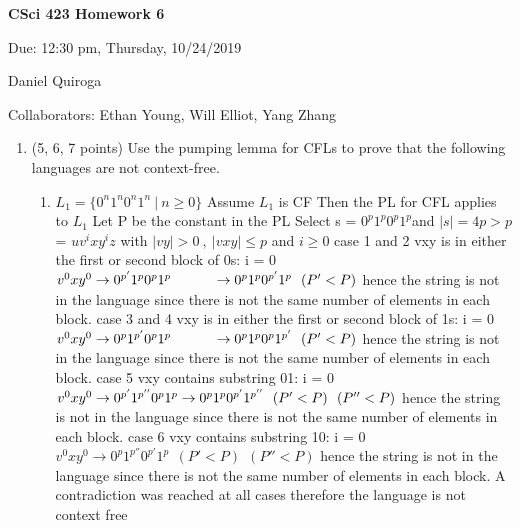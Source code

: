 \documentclass[11pt]{article}
\begin{document}
\begin{LARGE}
\centerline {\bf CSci 423 Homework 6}
\end{LARGE}
\vskip 0.25cm

\centerline{Due: 12:30 pm, Thursday, 10/24/2019}
\centerline{Daniel Quiroga}
Collaborators: Ethan Young, Will Elliot, Yang Zhang
\begin{enumerate}

\item (5, 6, 7 points) Use the pumping lemma for CFLs to prove that the following languages are not context-free.

\begin{enumerate}

\item $L_1=\{0^n1^n0^n1^n\ |\ n\ge0\}$
\newline Assume $L_1$ is CF \newline 
Then the PL for CFL applies to $L_1$ \newline 
Let P be the constant in the PL \newline 
Select s = $0^p1^p0^p1^p$and $|s| = 4p > p$\newline 
= $uv^ixy^iz$ with $|vy| > 0 \ , \ |vxy| \le p $ and $i \ge0 $\newline \newline 
case 1 and 2 vxy is in either the first or second block of 0s: \newline 
i = 0 $v^0xy^0 \rightarrow 0^{p'}1^p0^p1^p\newline 
\ \ \ \ \ \ \ \ \ \rightarrow 0^p1^p0^{p'}1^p \ \ (P' < P)$ hence the string is not in the language since there is not the same number of elements in each block. \newline \newline 
case 3 and 4 vxy is in either the first or second block of 1s: \newline 
i = 0 $v^0xy^0 \rightarrow 0^p1^{p'}0^p1^p\newline 
\ \ \ \ \ \ \ \ \ \rightarrow 0^p1^p0^p1^{p'} \ \ (P' < P)$ hence the string is not in the language since there is not the same number of elements in each block. \newline \newline 
case 5 vxy contains substring 01: \newline 
i = 0 $v^0xy^0 \rightarrow 0^{p'}1^{p''}0^p1^p \newline 
\rightarrow 0^p1^p0^{p'}1^{p''} \ \ (P' < P) \ \ (P'' < P)$ hence the string is not in the language since there is not the same number of elements in each block. \newline \newline 
case 6 vxy contains substring 10: \newline 
i = 0 $v^0xy^0 \rightarrow 0^p1^{p''}0^{p'}1^p \ \ (P' < P) \ \ (P'' < P)$ hence the string is not in the language since there is not the same number of elements in each block.\newline \newline 
A contradiction was reached at all cases therefore the language is not context free


\end{enumerate}
\end{enumerate}
\end{document}
